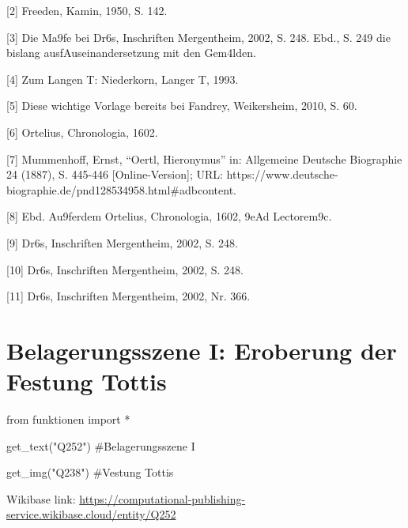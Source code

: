 \documentclass[
  letterpaper,
]{book}
\newenvironment{Shaded}{\begin{snugshade}}{\end{snugshade}}
\newcommand{\CommentTok}[1]{\textcolor[rgb]{0.37,0.37,0.37}{#1}}
\newcommand{\ImportTok}[1]{\textcolor[rgb]{0.00,0.46,0.62}{#1}}
\newcommand{\NormalTok}[1]{\textcolor[rgb]{0.00,0.23,0.31}{#1}}
\newcommand{\OperatorTok}[1]{\textcolor[rgb]{0.37,0.37,0.37}{#1}}
\newcommand{\StringTok}[1]{\textcolor[rgb]{0.13,0.47,0.30}{#1}}
\begin{document}
{[}2{]} Freeden, Kamin, 1950, S. 142.

{[}3{]} Die Ma\x9fe bei Dr\xb6s, Inschriften Mergentheim, 2002,
S. 248. Ebd., S. 249 die bislang
ausf\xbchrlichste Auseinandersetzung mit den Gem\xa4lden.

{[}4{]} Zum Langen T\xbcrkenkrieg: Niederkorn, Langer
T\xbcrkenkrieg, 1993.

{[}5{]} Diese wichtige Vorlage bereits bei Fandrey, Weikersheim, 2010,
S. 60.

{[}6{]} Ortelius, Chronologia, 1602.

{[}7{]} Mummenhoff, Ernst, ``Oertl, Hieronymus'' in: Allgemeine Deutsche
Biographie 24 (1887), S. 445-446 {[}Online-Version{]}; URL:
https://www.deutsche-biographie.de/pnd128534958.html\#adbcontent.

{[}8{]} Ebd. Au\x9ferdem Ortelius, Chronologia, 1602, \x9eAd
Lectorem\x9c.

{[}9{]} Dr\xb6s, Inschriften Mergentheim, 2002, S.
248.

{[}10{]} Dr\xb6s, Inschriften Mergentheim, 2002, S.
248.

{[}11{]} Dr\xb6s, Inschriften Mergentheim, 2002, Nr. 366.


\chapter{Belagerungsszene I: Eroberung der Festung
Tottis}\label{belagerungsszene-i-eroberung-der-festung-tottis}

\begin{Shaded}
\begin{Highlighting}[]
\ImportTok{from}\NormalTok{ funktionen }\ImportTok{import} \OperatorTok{*}
\end{Highlighting}
\end{Shaded}

\begin{Shaded}
\begin{Highlighting}[]
\NormalTok{get\_text(}\StringTok{"Q252"}\NormalTok{)}
\CommentTok{\#Belagerungsszene I}

\NormalTok{get\_img(}\StringTok{"Q238"}\NormalTok{)}
\CommentTok{\#Vestung Tottis}
\end{Highlighting}
\end{Shaded}

Wikibase link:
\url{https://computational-publishing-service.wikibase.cloud/entity/Q252}
\end{document}
